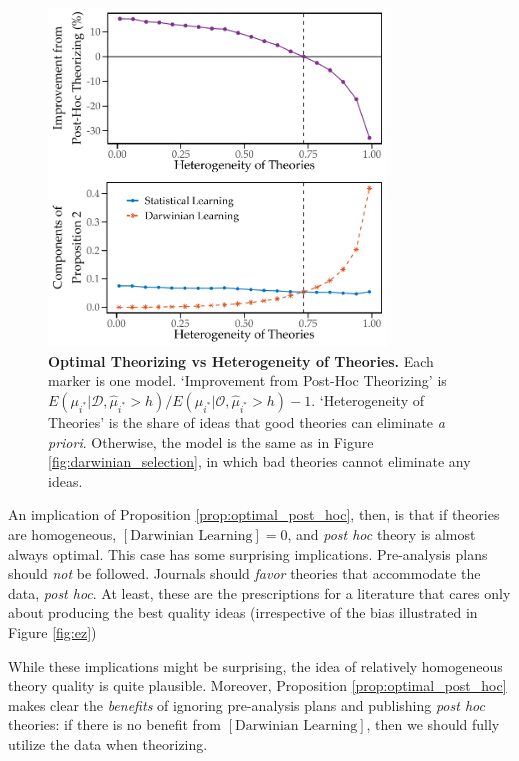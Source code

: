 \documentclass[12pt,english]{article}
\theoremstyle{plain}
\theoremstyle{plain}
\begin{document}
\begin{figure}
    \centering
    \includegraphics[width=0.8\textwidth]{../Results/many-qgood.pdf}
    \caption{\textbf{Optimal Theorizing vs Heterogeneity of Theories.} Each marker is one model. `Improvement from Post-Hoc Theorizing' is $E\left(\mu_{i^{\ast}}|\mathcal{D}, \hat{\mu}_{i^{\ast}}>h\right)/E\left(\mu_{i^{\ast}}|\mathcal{O}, \hat{\mu}_{i^{\ast}}>h\right)-1$. `Heterogeneity of Theories' is the share of ideas that good theories can eliminate \emph{a priori}. Otherwise, the model is the same as in Figure \ref{fig:darwinian_selection}, in which bad theories cannot eliminate any ideas.}
    \label{fig:prop2-het}
\end{figure}

An implication of Proposition \ref{prop:optimal_post_hoc}, then, is that if theories are homogeneous, $\left[\text{Darwinian Learning}\right]=0$, and \emph{post hoc} theory is almost always optimal. This case has some surprising implications. Pre-analysis plans should \emph{not} be followed.  Journals should \emph{favor}  theories that accommodate the data, \emph{post hoc}. At least, these are the prescriptions for a literature that cares only about producing the best quality ideas (irrespective of the bias illustrated in Figure \ref{fig:ez})

While these implications might be surprising, the idea of relatively homogeneous theory quality is quite plausible. Moreover, Proposition \ref{prop:optimal_post_hoc} makes clear the \emph{benefits} of ignoring pre-analysis plans and publishing \emph{post hoc} theories: if there is no benefit from $\left[\text{Darwinian Learning}\right]$, then we should fully utilize the data when theorizing.
\end{document}
